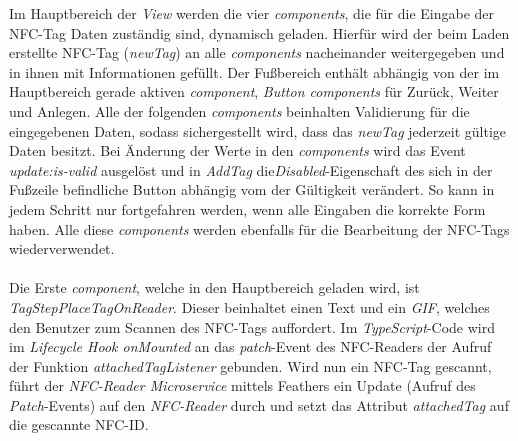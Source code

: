 \documentclass[10pt, a4paper]{article}
\begin{document}
\begin{onehalfspace}
Im Hauptbereich der \textit{View} werden die vier \textit{components}, die für die Eingabe der NFC-Tag Daten zuständig sind, dynamisch geladen.
Hierfür wird der beim Laden erstellte NFC-Tag (\textit{newTag}) an alle \textit{components} nacheinander weitergegeben und in ihnen mit Informationen gefüllt.
Der Fußbereich enthält abhängig von der im Hauptbereich gerade aktiven \textit{component}, \textit{Button components} für \glqq Zurück\grqq{}, \glqq Weiter\grqq{} und
\glqq Anlegen\grqq.
Alle der folgenden \textit{components} beinhalten Validierung für die eingegebenen Daten, sodass sichergestellt wird, dass das \textit{newTag} jederzeit gültige Daten besitzt.
Bei Änderung der Werte in den \textit{components} wird das Event \textit{update:is-valid} ausgelöst und in \textit{AddTag} die\textit{Disabled}-Eigenschaft des sich in der Fußzeile befindliche Button abhängig vom der Gültigkeit verändert.
So kann in jedem Schritt nur fortgefahren werden, wenn alle Eingaben die korrekte Form haben.
Alle diese \textit{components} werden ebenfalls für die Bearbeitung der NFC-Tags wiederverwendet.
\\~\\
Die Erste \textit{component}, welche in den Hauptbereich geladen wird, ist \textit{TagStepPlaceTagOnReader}. Dieser beinhaltet einen Text und ein \textit{GIF},
welches den Benutzer zum Scannen des NFC-Tags auffordert. Im \textit{TypeScript}-Code wird im \textit{Lifecycle Hook onMounted} an das \textit{patch}-Event des
NFC-Readers der Aufruf der Funktion \textit{attachedTagListener} gebunden. Wird nun ein NFC-Tag gescannt, führt der \textit{NFC-Reader Microservice} mittels Feathers ein Update (Aufruf des \textit{Patch}-Events) auf den \textit{NFC-Reader} durch und setzt das Attribut \textit{attachedTag} auf die gescannte NFC-ID.

\end{onehalfspace}
\end{document}
